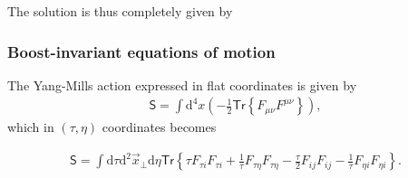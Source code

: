 The solution is thus completely given by

\vspace{0.5cm}

\begin{fullwidth}
\end{fullwidth}


\subsubsection*{Boost-invariant equations of motion} 
The Yang-Mills action expressed in flat coordinates is given by
\begin{align}\label{sglasma13}
    \textsf{S}=\int\mathrm{d}^4x\left(-\frac{1}{2}\textsf{Tr}\left\{F_{\mu\nu}F^{\mu\nu}\right\}\right),
\end{align}
which in $(\tau,\eta)$ coordinates becomes
\begin{fullwidth}
\begin{align}\label{sglasma14}
    \textsf{S}=\int\mathrm{d}\tau\mathrm{d}^2\vec{x}_\perp\mathrm{d}\eta\textsf{Tr}\left\{\tau F_{\tau i}F_{\tau i}+\frac{1}{\tau}F_{\tau\eta}F_{\tau\eta}-\frac{\tau}{2}F_{ij}F_{ij}-\frac{1}{\tau}F_{\eta i}F_{\eta i}\right\}.
\end{align}
\end{fullwidth}

